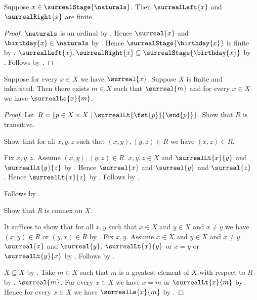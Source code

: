 \begin{theorem}\label{finite_surreal_options}
    Suppose $x\in\surrealStage{\naturals}$.
    Then $\surrealLeft{x}$ and $\surrealRight{x}$ are finite.
\end{theorem}
\begin{proof}
    $\naturals$ is an ordinal by .
    Hence $\surreal{x}$ and $\birthday{x}\in\naturals$
        by .
    Hence $\surrealStage{\birthday{x}}$ is finite
        by .
    $\surrealLeft{x},\surrealRight{x}
        \subseteq\surrealStage{\birthday{x}}$
        by .
    Follows by .
\end{proof}

\begin{theorem}\label{finite_surreal_maximum}
    Suppose for every $x\in X$ we have $\surreal{x}$.
    Suppose $X$ is finite and inhabited.
    Then there exists $m\in X$ such that $\surreal{m}$ and
        for every $x\in X$ we have $\surrealLe{x}{m}$.
\end{theorem}
\begin{proof}
    Let $R=\{p\in X\times X\mid
        \surrealLt{\fst{p}}{\snd{p}}\}$.
    Show that $R$ is transitive.
    \begin{subproof}
        Show that for all $x,y,z$ such that
            $(x,y),(y,z)\in R$ we have $(x,z)\in R$.
        \begin{subproof}
            Fix $x,y,z$.
            Assume $(x,y),(y,z)\in R$.
            $x,y,z\in X$ and
                $\surrealLt{x}{y}$ and $\surrealLt{y}{z}$
                by .
            Hence $\surreal{x}$ and $\surreal{y}$ and $\surreal{z}$.
            Hence $\surrealLt{x}{z}$
                by .
            Follows by .
        \end{subproof}
        Follows by .
    \end{subproof}
    Show that $R$ is connex on $X$.
    \begin{subproof}
        It suffices to show that for all $x,y$ such that
            $x\in X$ and $y\in X$ and $x\neq y$ we have
            $(x,y)\in R$ or $(y,x)\in R$ by .
        Fix $x,y$.
        Assume $x\in X$ and $y\in X$ and $x\neq y$.
        $\surreal{x}$ and $\surreal{y}$.
        $\surrealLt{x}{y}$ or $x=y$ or $\surrealLt{y}{x}$
            by .
        Follows by .
    \end{subproof}
    $X\subseteq X$ by .
    Take $m\in X$ such that
        $m$ is a greatest element of $X$ with respect to $R$
        by .
    $\surreal{m}$.
    For every $x\in X$ we have $x=m$ or $\surrealLt{x}{m}$
        by .
    Hence for every $x\in X$ we have $\surrealLe{x}{m}$
        by .
\end{proof}

